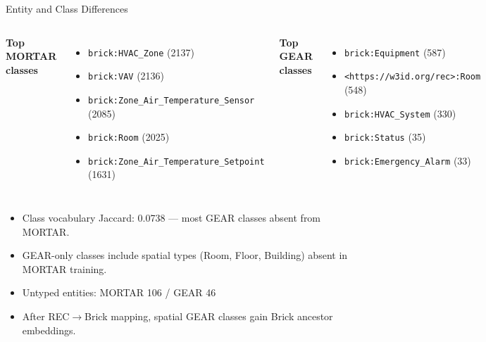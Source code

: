 \documentclass[10pt]{beamer}
\begin{document}
\begin{frame}{Entity and Class Differences}
  \begin{columns}[t]
    \textbf{Top MORTAR classes}\par
    \begin{itemize}
      \item \texttt{brick:HVAC\_Zone} (2137)
      \item \texttt{brick:VAV} (2136)
      \item \texttt{brick:Zone\_Air\_Temperature\_Sensor} (2085)
      \item \texttt{brick:Room} (2025)
      \item \texttt{brick:Zone\_Air\_Temperature\_Setpoint} (1631)
    \end{itemize}
    \textbf{Top GEAR classes}\par
    \begin{itemize}
      \item \texttt{brick:Equipment} (587)
      \item \texttt{\textless{}https://w3id.org/rec\textgreater{}:Room} (548)
      \item \texttt{brick:HVAC\_System} (330)
      \item \texttt{brick:Status} (35)
      \item \texttt{brick:Emergency\_Alarm} (33)
    \end{itemize}
  \end{columns}
  \vspace{0.4em}
  \begin{itemize}
    \item Class vocabulary Jaccard: 0.0738 --- most GEAR classes absent from MORTAR.
    \item GEAR-only classes include spatial types (Room, Floor, Building) absent in MORTAR training.
    \item Untyped entities: MORTAR 106 / GEAR 46
    \item After REC$\to$Brick mapping, spatial GEAR classes gain Brick ancestor embeddings.
  \end{itemize}
\end{frame}
\end{document}
